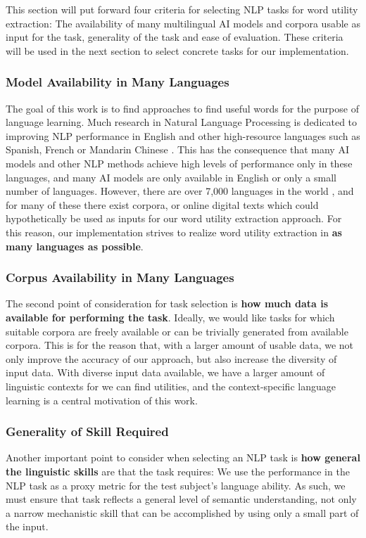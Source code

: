 This section will put forward four criteria for selecting NLP tasks for word utility extraction:
The availability of many multilingual AI models and corpora usable as input for the task, generality of the task and ease of evaluation.
These criteria will be used in the next section to select concrete tasks for our implementation.

\subsubsection{Model Availability in Many Languages}
The goal of this work is to find approaches to find useful words for the purpose of language learning.
Much research in Natural Language Processing is dedicated to improving NLP performance in English and other high-resource languages such as Spanish, French or Mandarin Chinese .
This has the consequence that many AI models and other NLP methods achieve high levels of performance only in these languages, and many AI models are only available in English or only a small number of languages.
However, there are over 7,000 languages in the world , and for many of these there exist corpora, or online digital texts which could hypothetically be used as inputs for our word utility extraction approach.
For this reason, our implementation strives to realize word utility extraction in \textbf{as many languages as possible}.

\subsubsection{Corpus Availability in Many Languages}
The second point of consideration for task selection is \textbf{how much data is available for performing the task}.
Ideally, we would like tasks for which suitable corpora are freely available or can be trivially generated from available corpora.
This is for the reason that, with a larger amount of usable data, we not only improve the accuracy of our approach, but also increase the diversity of input data.
With diverse input data available, we have a larger amount of linguistic contexts for we can find utilities, and the context-specific language learning is a central motivation of this work.

\subsubsection{Generality of Skill Required}
Another important point to consider when selecting an NLP task is \textbf{how general the linguistic skills} are that the task requires:
We use the performance in the NLP task as a proxy metric for the test subject's language ability.
As such, we must ensure that task reflects a general level of semantic understanding, not only a narrow mechanistic skill that can be accomplished by using only a small part of the input.


